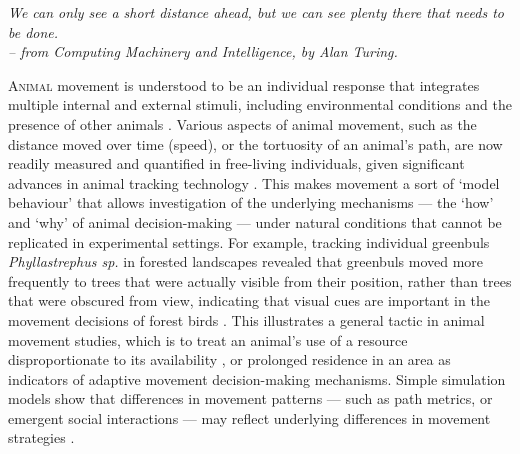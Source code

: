 

\begin{center}
    \emph{We can only see a short distance ahead, but we can see plenty there that needs to be done.\\
    \medskip
    -- \small{from Computing Machinery and Intelligence, by Alan Turing.}}
\end{center}

\lettrine{A}{nimal} movement is understood to be an individual response that integrates multiple internal and external stimuli, including environmental conditions and the presence of other animals \citep{nathan2008a}.
Various aspects of animal movement, such as the distance moved over time (speed), or the tortuosity of an animal's path, are now readily measured and quantified in free-living individuals, given significant advances in animal tracking technology \citep[][see Nathan et al. \textit{in prep.}]{cagnacci2010}.
This makes movement a sort of `model behaviour' that allows investigation of the underlying mechanisms --- the `how' and `why' of animal decision-making --- under natural conditions that cannot be replicated in experimental settings.
For example, tracking individual greenbuls \textit{Phyllastrephus sp.} in forested landscapes revealed that greenbuls moved more frequently to trees that were actually visible from their position, rather than trees that were obscured from view, indicating that visual cues are important in the movement decisions of forest birds \citep[][see also \citep{aben2018}]{aben2021}.
This illustrates a general tactic in animal movement studies, which is to treat an animal's use of a resource disproportionate to its availability \citep{manly2007,fortin2005,signer2019}, or prolonged residence in an area \citep{bracis2018} as indicators of adaptive movement decision-making mechanisms.
Simple simulation models show that differences in movement patterns --- such as path metrics, or emergent social interactions --- may reflect underlying differences in movement strategies \citep{spiegel2017,stuber2022,spiegel2022}.

